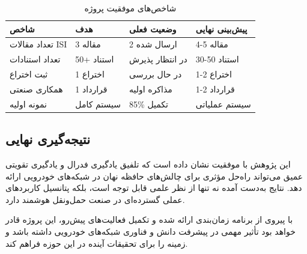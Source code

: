 \documentclass[11pt]{article}
\begin{document}
\begin{table}[h]
\centering
\caption{شاخص‌های موفقیت پروژه}
\label{tab:success_metrics}
\begin{tabular}{|p{4cm}|p{3cm}|p{3cm}|p{3cm}|}
\hline
\textbf{شاخص} & \textbf{هدف} & \textbf{وضعیت فعلی} & \textbf{پیش‌بینی نهایی} \\
\hline
تعداد مقالات ISI & 3 مقاله & 2 ارسال شده & 4-5 مقاله \\
\hline
تعداد استنادات & 50+ استناد & در انتظار پذیرش & 30-50 استناد \\
\hline
ثبت اختراع & 1 اختراع & در حال بررسی & 1-2 اختراع \\
\hline
همکاری صنعتی & 1 قرارداد & مذاکره اولیه & 1-2 قرارداد \\
\hline
نمونه اولیه & سیستم کامل & 85\% تکمیل & سیستم عملیاتی \\
\hline
\end{tabular}
\end{table}

\subsection{نتیجه‌گیری نهایی}

این پژوهش با موفقیت نشان داده است که تلفیق یادگیری فدرال و یادگیری تقویتی عمیق می‌تواند راه‌حل مؤثری برای چالش‌های حافظه نهان در شبکه‌های خودرویی ارائه دهد. نتایج به‌دست آمده نه تنها از نظر علمی قابل توجه است، بلکه پتانسیل کاربردهای عملی گسترده‌ای در صنعت حمل‌ونقل هوشمند دارد.

با پیروی از برنامه زمان‌بندی ارائه شده و تکمیل فعالیت‌های پیش‌رو، این پروژه قادر خواهد بود تأثیر مهمی در پیشرفت دانش و فناوری شبکه‌های خودرویی داشته باشد و زمینه را برای تحقیقات آینده در این حوزه فراهم کند.
\end{document}
